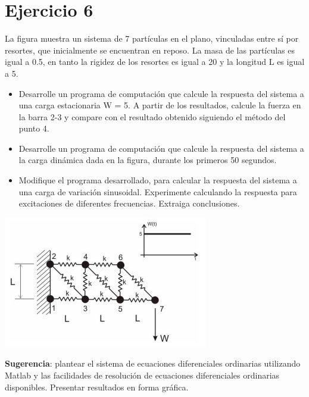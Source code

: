 \documentclass[a4paper,12pt,twoside,final,spanish]{article}
\begin{document}
\section{Ejercicio 6}

La figura muestra un sistema de 7 partículas en el plano, vinculadas entre sí por resortes, que inicialmente se encuentran en reposo. La masa de las partículas es igual a 0.5, en tanto la rigidez de los resortes es igual a 20 y la longitud L es igual a 5.
\begin{itemize}
\item Desarrolle un programa de computación que calcule la respuesta del sistema a una carga estacionaria W = 5. A partir de los resultados, calcule la fuerza en la 
barra 2-3 y compare con el resultado obtenido siguiendo el método del punto 4.
\item Desarrolle un programa de computación que calcule la respuesta del sistema a la carga dinámica dada en la figura, durante los primeros 50 segundos.
\item Modifique el programa desarrollado, para calcular la respuesta del sistema a una  carga de variación sinusoidal. Experimente calculando la respuesta para excitaciones de diferentes frecuencias. Extraiga conclusiones. 
\end{itemize}

\includegraphics[width=0.9\linewidth,keepaspectratio]{ejercicio6}

\textbf{Sugerencia}: plantear el sistema de ecuaciones diferenciales ordinarias utilizando Matlab y las facilidades de resolución de ecuaciones diferenciales ordinarias disponibles. Presentar resultados en forma gráfica.

\dotfill
\end{document}

